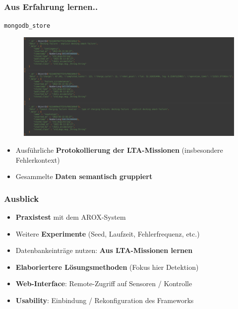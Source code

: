 \documentclass{beamer}
\newcommand{\code}[1]{\colorbox{light-gray}{\texttt{#1}}}
\begin{document}
\begin{frame}
  \frametitle{Aus Erfahrung lernen..}
  \code{mongodb\_store}
  \begin{figure}[H]
    \centering
    \includegraphics[width=\textwidth]{img/database_entries.png}
  \end{figure}
  \begin{itemize}
    \item Ausführliche \textbf{Protokollierung der LTA-Missionen} (insbesondere Fehlerkontext)
    \item Gesammelte \textbf{Daten semantisch gruppiert}
  \end{itemize}
\end{frame}

\begin{frame}
  \frametitle{Ausblick}
  \begin{itemize}
    \item \textbf{Praxistest} mit dem AROX-System
    \item Weitere \textbf{Experimente} (Seed, Laufzeit, Fehlerfrequenz, etc.)
    \item Datenbankeinträge nutzen: \textbf{Aus LTA-Missionen lernen}
    \item \textbf{Elaboriertere Lösungsmethoden} (Fokus hier Detektion)
    \item \textbf{Web-Interface}: Remote-Zugriff auf Sensoren / Kontrolle
    \item \textbf{Usability}: Einbindung / Rekonfiguration des Frameworks
  \end{itemize}
\end{frame}

\begin{frame}[allowframebreaks]
  
  
\end{frame}
\end{document}
